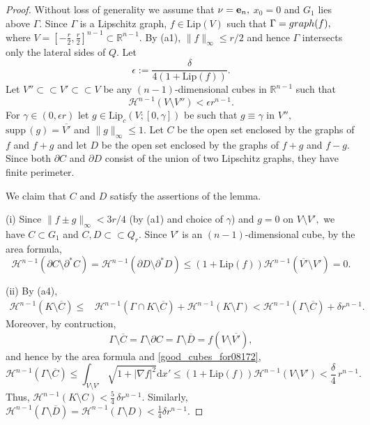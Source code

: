 \documentclass[reqno]{amsart}
\numberwithin{equation}{section}
\theoremstyle{plain}
\theoremstyle{definition}
\newcommand{\R}{\mathbb{R}}
\newcommand{\cH}{\mathcal{H}}
\newcommand{\p}{\partial}
\newcommand{\cl}[1]{\overline{#1}}
\renewcommand{\d}{\mathrm{d}}
\newcommand{\e}{{\bf e}}
\newcommand{\strictlyincluded}{\subset\subset}
\newcommand{\supp}{\mathrm{supp}\,}
\newcommand{\Lip}{\mathrm{Lip}}
\begin{document}
\begin{proof}
Without loss of generality we assume that $\nu=\e_n,$ $x_0=0$ and  $G_1$ lies above $\Gamma$. Since $\Gamma$ is a Lipschitz graph, $f\in \Lip(V)$ such that $\Gamma={\rm graph}(f),$ where $V=[-\frac r2,\frac r2]^{n-1}\subset\R^{n-1}.$ By (a1), $\|f\|_\infty\le r/2$ and hence $\Gamma$ intersects only the  lateral sides of $Q.$
Let 
$$
\epsilon:=\frac{\delta}{4(1+\Lip(f))}.
$$
Let $V''\strictlyincluded V'\strictlyincluded V$ be any $(n-1)$-dimensional cubes in $\R^{n-1}$ such that 
\begin{equation}\label{good_cubes_for08172}
\cH^{n-1}(V\setminus V'')<\epsilon r^{n-1}. 
\end{equation}
%
For $\gamma\in(0,\epsilon r)$ let $g\in \Lip_c(V;[0,\gamma])$ be such that $g\equiv\gamma$ in $V'',$ $\supp(g)=\cl{V'}$ and $\|g\|_\infty\le 1.$ Let $C$ be the open set enclosed by the graphs of $f$ and $f+g$ and let $D$ be the open set enclosed by the graphs of $f+g$ and $f-g.$ Since both $\p C$ and $\p D$ consist of the union of two Lipschitz graphs, they have finite perimeter.

We claim that $C$ and $D$ satisfy the assertions of the lemma.

(i) Since $\|f\pm g\|_\infty<3r/4$ (by (a1) and choice of $\gamma$) and $g=0$ on $V\setminus V',$ we have $C\subset G_1$ and $C,D\strictlyincluded Q_r.$ Since $V'$ is an $(n-1)$-dimensional cube, by the area formula,
$$
\cH^{n-1}(\p C\setminus \p^*C) =\cH^{n-1}(\p D\setminus \p^*D) \le (1+\Lip(f)) \cH^{n-1}(\cl{V'}\setminus V')=0.
$$

(ii) By  (a4),
\begin{align*}
\cH^{n-1}(K \setminus \cl{C}) \le & \cH^{n-1}(\Gamma\cap K \setminus \cl{C}) + \cH^{n-1}(K \setminus \Gamma)
< \cH^{n-1}(\Gamma\setminus \cl{C}) +\delta r^{n-1}.
\end{align*}
Moreover, by contruction,
$$
\Gamma\setminus \cl{C}=\Gamma\setminus\p C=\Gamma\setminus\cl{D}=f(V\setminus \cl{V'}),
$$ 
and hence by the area formula and \eqref{good_cubes_for08172},
%
\begin{equation}\label{bad_part_ingamma}
\cH^{n-1}(\Gamma\setminus \cl{C}) \le \int_{V\setminus V'} \sqrt{1+|\nabla f|^2}\d x' \le (1 + \Lip(f)) \cH^{n-1}(V\setminus V') < \frac{\delta}{4}\, r^{n-1}. 
\end{equation}
%
Thus, $\cH^{n-1}(K \setminus C)<\frac54\,\delta r^{n-1}.$
Similarly, $\cH^{n-1}(\Gamma\setminus \cl{D}) =\cH^{n-1}(\Gamma\setminus D)<\frac{1}{4}\delta r^{n-1}.$



\end{proof}
\end{document}
